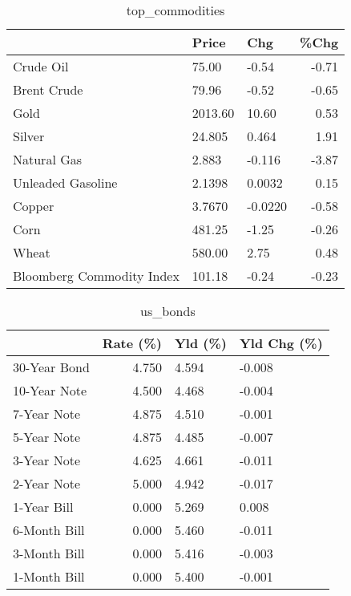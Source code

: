 \documentclass{article}%
\begin{document}
\begin{table}[htbp]%
\caption{top\_commodities}%
\centering%
\begin{adjustbox}{width=1\textwidth}%
\begin{tabular}{lllr}
\toprule
                          &   Price &     Chg &  \%Chg \\
\midrule
               Crude Oil  &   75.00 &   -0.54 & -0.71 \\
             Brent Crude  &   79.96 &   -0.52 & -0.65 \\
                    Gold  & 2013.60 &   10.60 &  0.53 \\
                  Silver  &  24.805 &   0.464 &  1.91 \\
             Natural Gas  &   2.883 &  -0.116 & -3.87 \\
       Unleaded Gasoline  &  2.1398 &  0.0032 &  0.15 \\
                  Copper  &  3.7670 & -0.0220 & -0.58 \\
                    Corn  &  481.25 &   -1.25 & -0.26 \\
                   Wheat  &  580.00 &    2.75 &  0.48 \\
Bloomberg Commodity Index &  101.18 &   -0.24 & -0.23 \\
\bottomrule
\end{tabular}
%
\end{adjustbox}%
\end{table}

%


\begin{table}[htbp]%
\caption{us\_bonds}%
\centering%
\begin{adjustbox}{width=1\textwidth}%
\begin{tabular}{lrll}
\toprule
             &  Rate (\%) & Yld (\%) & Yld Chg (\%) \\
\midrule
30-Year Bond &     4.750 &   4.594 &      -0.008 \\
10-Year Note &     4.500 &   4.468 &      -0.004 \\
 7-Year Note &     4.875 &   4.510 &      -0.001 \\
 5-Year Note &     4.875 &   4.485 &      -0.007 \\
 3-Year Note &     4.625 &   4.661 &      -0.011 \\
 2-Year Note &     5.000 &   4.942 &      -0.017 \\
 1-Year Bill &     0.000 &   5.269 &       0.008 \\
6-Month Bill &     0.000 &   5.460 &      -0.011 \\
3-Month Bill &     0.000 &   5.416 &      -0.003 \\
1-Month Bill &     0.000 &   5.400 &      -0.001 \\
\bottomrule
\end{tabular}
%
\end{adjustbox}%
\end{table}
\end{document}
